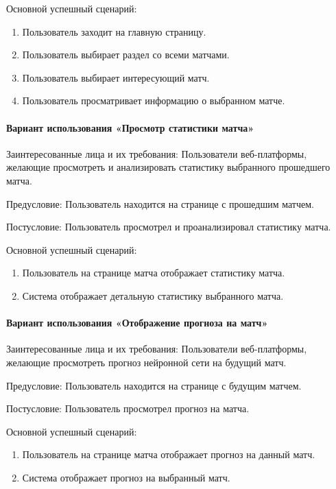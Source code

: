 Основной успешный сценарий:
\begin{enumerate}
	\item Пользователь заходит на главную страницу.
	\item Пользователь выбирает раздел со всеми матчами.
	\item Пользователь выбирает интересующий матч.
	\item Пользователь просматривает информацию о выбранном матче.
\end{enumerate}

\paragraph{Вариант использования «Просмотр статистики матча»}

Заинтересованные лица и их требования: Пользователи веб-платформы, желающие просмотреть и анализировать статистику выбранного прошедшего матча.

Предусловие: Пользователь находится на странице с прошедшим матчем.

Постусловие: Пользователь просмотрел и проанализировал статистику матча.

Основной успешный сценарий:
\begin{enumerate}
	\item Пользователь на странице матча отображает статистику матча.
	\item Система отображает детальную статистику выбранного матча.
\end{enumerate}

\paragraph{Вариант использования «Отображение прогноза на матч»}

Заинтересованные лица и их требования: Пользователи веб-платформы, желающие просмотреть прогноз нейронной сети на будущий матч.

Предусловие: Пользователь находится на странице с будущим матчем.

Постусловие: Пользователь просмотрел прогноз на матча.

Основной успешный сценарий:
\begin{enumerate}
	\item Пользователь на странице матча отображает прогноз на данный матч.
	\item Система отображает прогноз на выбранный матч.
\end{enumerate}

